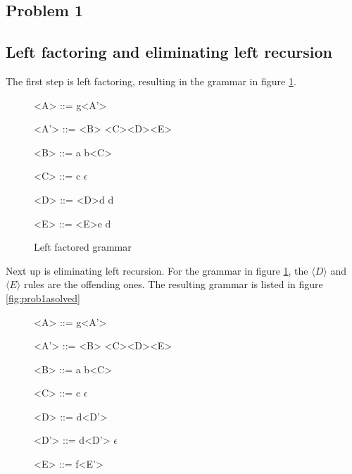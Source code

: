 \documentclass[twoside]{article}
\begin{document}
\begin{multicols}{2} %

    \section{Problem 1}
    \subsection{Left factoring and eliminating left recursion}

    The first step is left factoring, resulting in the grammar in figure \ref{fig:prob1aleftfactored}.

    \begin{figure}[H]
        \begin{grammar}
            <A>     ::= g<A'>

            <A'>    ::= <B>
            \alt <C><D><E>

            <B>     ::= a
            \alt b<C>

            <C>     ::= c
            \alt $\epsilon$

            <D>     ::= <D>d
            \alt d

            <E>     ::= <E>e
            \alt d
        \end{grammar}
        \caption{Left factored grammar} \label{fig:prob1aleftfactored}
    \end{figure}

    Next up is eliminating left recursion.
    For the grammar in figure \ref{fig:prob1aleftfactored}, the $\langle D \rangle$ and $\langle E \rangle$ rules are the offending ones.
    The resulting grammar is listed in figure \ref{fig:prob1asolved}

    \begin{figure}[H]
        \begin{grammar}
            <A>     ::= g<A'>

            <A'>    ::= <B>
            \alt <C><D><E>

            <B>     ::= a
            \alt b<C>

            <C>     ::= c
            \alt $\epsilon$

            <D>     ::= d<D'>

            <D'>    ::= d<D'>
            \alt $\epsilon$

            <E>     ::= f<E'>


\end{grammar}
\end{figure}
\end{multicols}
\end{document}
